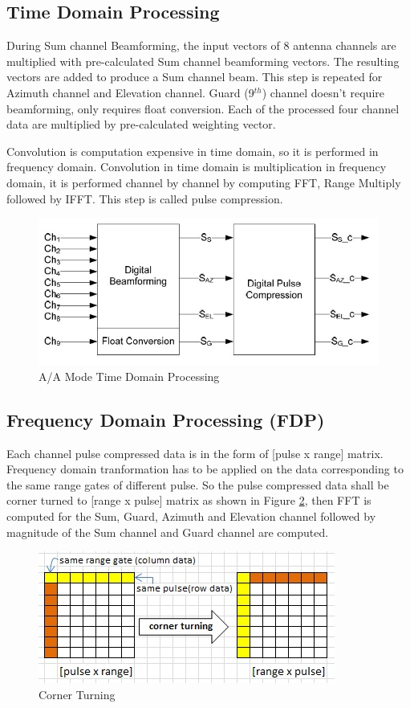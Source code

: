 \subsection{Time Domain Processing}
During Sum channel Beamforming, the input vectors of 8 antenna channels are multiplied with pre-calculated Sum channel beamforming vectors. The resulting vectors are added to produce a Sum channel beam. This step is repeated for Azimuth channel and Elevation channel. Guard (9$^{th}$) channel doesn't require beamforming, only requires float conversion. Each of the processed four channel data are multiplied by pre-calculated weighting vector. 

Convolution is computation expensive in time domain, so it is performed in frequency domain. Convolution in time domain is multiplication in frequency domain, it is performed channel by channel by computing FFT, Range Multiply followed by IFFT. This step is called pulse compression.

\begin{figure}[h!]
	\centering
	\includegraphics[width=120mm]{figures/aa_tdp}
	\caption{A/A Mode Time Domain Processing}
	\label{fig:bg_related_work:aa_tdp}
\end{figure}

\subsection{Frequency Domain Processing (FDP)}
Each channel pulse compressed data is in the form of [pulse x range] matrix. Frequency domain tranformation has to be applied on the data corresponding to the same range gates of different pulse. So the pulse compressed data shall be corner turned to [range x pulse] matrix as shown in Figure \ref{fig:bg_related_work:cot}, then FFT is computed for the Sum, Guard, Azimuth and Elevation channel followed by magnitude of the Sum channel and Guard channel are computed.

\begin{figure}[h!]
	\centering
	\includegraphics[]{figures/cot}
	\caption{Corner Turning}
	\label{fig:bg_related_work:cot}
\end{figure}

